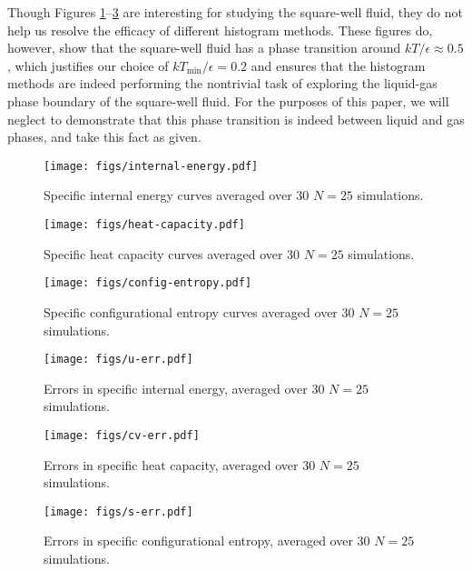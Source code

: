 \documentclass[11pt]{article}
\renewcommand{\t}{\text} %
\begin{document}
Though Figures \ref{fig:internal_energy}--\ref{fig:config_entropy} are
interesting for studying the square-well fluid, they do not help us
resolve the efficacy of different histogram methods. These figures do,
however, show that the square-well fluid has a phase transition around
$kT/\epsilon\approx0.5$, which justifies our choice of
$kT_{\t{min}}/\epsilon=0.2$ and ensures that the histogram methods are
indeed performing the nontrivial task of exploring the liquid-gas
phase boundary of the square-well fluid. For the purposes of this
paper, we will neglect to demonstrate that this phase transition is
indeed between liquid and gas phases, and take this fact as given.

\begin{figure}[!b]
  \centering
  \texttt{[image: figs/internal-energy.pdf]}
  \caption[Internal energy]
  {Specific internal energy curves averaged over 30 $N=25$
    simulations.}
  \label{fig:internal_energy}
\end{figure}

\begin{figure}
  \centering
  \texttt{[image: figs/heat-capacity.pdf]}
  \caption[Heat capacity]
  {Specific heat capacity curves averaged over 30 $N=25$ simulations.}
  \label{fig:heat_capacity}
\end{figure}

\begin{figure}
  \centering
  \texttt{[image: figs/config-entropy.pdf]}
  \caption[Configurational entropy]
  {Specific configurational entropy curves averaged over 30 $N=25$
    simulations.}
  \label{fig:config_entropy}
\end{figure}

\begin{figure}
  \centering
  \texttt{[image: figs/u-err.pdf]}
  \caption[Internal energy error scaling]
  {Errors in specific internal energy, averaged over 30 $N=25$
    simulations.}
  \label{fig:internal_energy_err}
\end{figure}

\begin{figure}
  \centering
  \texttt{[image: figs/cv-err.pdf]}
  \caption[Heat capacity error scaling]
  {Errors in specific heat capacity, averaged over 30 $N=25$
    simulations.}
  \label{fig:heat_capacity_err}
\end{figure}

\begin{figure}
  \centering
  \texttt{[image: figs/s-err.pdf]}
  \caption[Configurational entropy error scaling]
  {Errors in specific configurational entropy, averaged over 30 $N=25$
    simulations.}
  \label{fig:config_entropy_err}
\end{figure}
\end{document}
